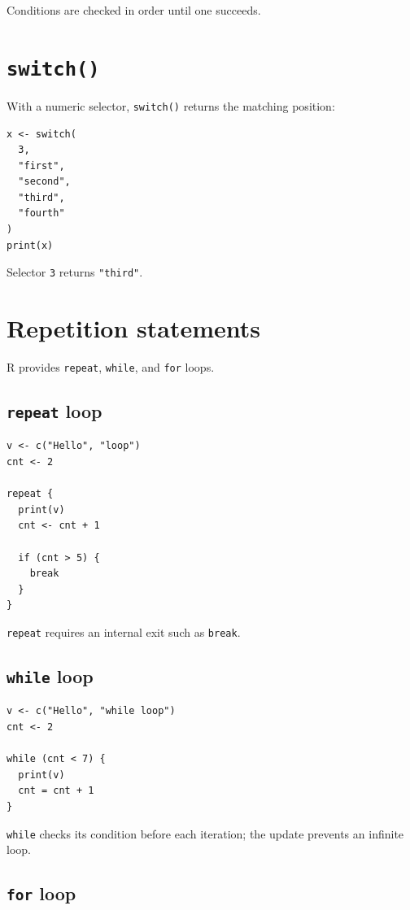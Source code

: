 Conditions are checked in order until one succeeds.

\section{\texttt{switch()}}

With a numeric selector, \texttt{switch()} returns the matching position:

\begin{lstlisting}[style=dsr]
x <- switch(
  3,
  "first",
  "second",
  "third",
  "fourth"
)
print(x)
\end{lstlisting}

Selector \texttt{3} returns \texttt{"third"}.

\section{Repetition statements}

R provides \texttt{repeat}, \texttt{while}, and \texttt{for} loops.

\subsection{\texttt{repeat} loop}

\begin{lstlisting}[style=dsr]
v <- c("Hello", "loop")
cnt <- 2

repeat {
  print(v)
  cnt <- cnt + 1

  if (cnt > 5) {
    break
  }
}
\end{lstlisting}

\texttt{repeat} requires an internal exit such as \texttt{break}.

\subsection{\texttt{while} loop}

\begin{lstlisting}[style=dsr]
v <- c("Hello", "while loop")
cnt <- 2

while (cnt < 7) {
  print(v)
  cnt = cnt + 1
}
\end{lstlisting}

\texttt{while} checks its condition before each iteration; the update prevents an infinite loop.

\subsection{\texttt{for} loop}

